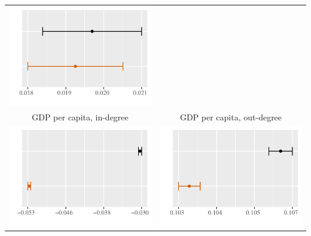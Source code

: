 \documentclass[reqno,onecolumn,letterpaper,12pt]{article}
\begin{document}
\begin{longtable}[!h]{c@{\hskip 0cm}c}
\includegraphics[height=.18\textheight, clip=true, trim=0cm 0cm 0cm .2cm]{draft_figures/plots_pooled/TradeVolume.pdf}   \\
GDP per capita, in-degree & GDP per capita, out-degree\\
\includegraphics[height=.18\textheight, clip=true, trim=0cm 0cm 0cm .2cm]{draft_figures/plots_pooled/GDPpc_in.pdf} &
\includegraphics[height=.18\textheight, clip=true, trim=0cm 0cm 0cm .2cm]{draft_figures/plots_pooled/GDPpc_out.pdf}   \\

\end{longtable}
\end{document}
